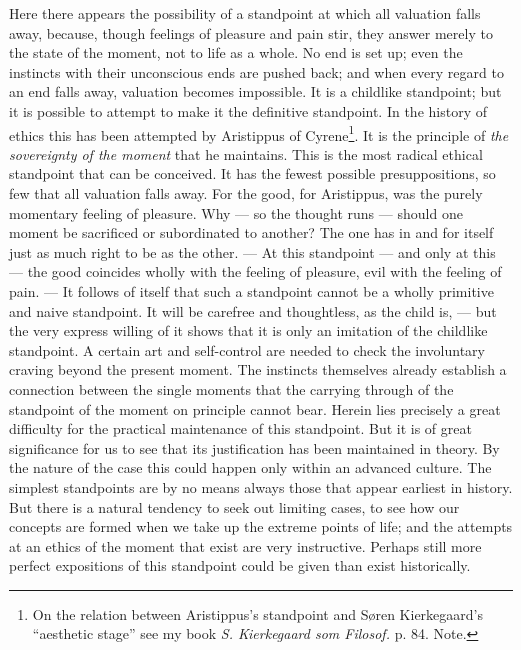 \documentclass[12pt,a4paper,openany]{book}
\newcommand{\opage}[1]{\marginnote{\footnotesize\textit{[#1]}}}
\begin{document}
Here there appears the possibility of a standpoint at which all valuation falls away, because,
though feelings of pleasure and pain stir, they answer merely to the state of the moment, not to
life as a whole. No end is set up; even the instincts with their unconscious ends are pushed back;
and when every regard to an end falls away, valuation becomes impossible. It is a childlike
standpoint; but it is possible to attempt to make it the definitive standpoint. In the history of
ethics this has been attempted by Aristippus of Cyrene\footnote[1]{On the relation between
Aristippus's standpoint and Søren Kierkegaard's ``aesthetic stage'' see my book \textit{S.
Kierkegaard som Filosof.} p. 84. Note.}. It is the principle of \textit{the sovereignty of the
moment} that he maintains. This is the most radical ethical standpoint that can be conceived. It has
the fewest possible presuppositions, so few that all valuation falls away. For the good, for
Aristippus, was the purely momentary feeling of pleasure. Why --- so the thought runs --- should one
moment be sacrificed or subordinated to another? The one has in and for itself just as much right to
be as the other. --- At this standpoint --- and only at this --- the good coincides wholly with the
feeling of pleasure, evil with the feeling of pain. --- It follows of itself that such a standpoint
cannot be a wholly primitive and naive standpoint. It will be carefree and thoughtless, as the child
is, --- but the very express willing of it shows that it is only an imitation of the childlike
standpoint. A certain art and self-control are needed to check the involuntary craving beyond the
present moment. The instincts themselves already establish a connection between the single moments
that the carrying through of the standpoint of the moment on principle cannot bear. Herein lies
precisely a great difficulty for the practical maintenance of
\opage{31}this standpoint. But it is of great significance for us to see that its justification has been
maintained in theory. By the nature of the case this could happen only within an advanced culture.
The simplest standpoints are by no means always those that appear earliest in history. But there is
a natural tendency to seek out limiting cases, to see how our concepts are formed when we take up
the extreme points of life; and the attempts at an ethics of the moment that exist are very
instructive. Perhaps still more perfect expositions of this standpoint could be given than exist
historically.
\end{document}
